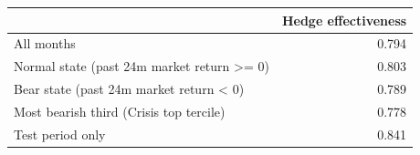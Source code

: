 \begin{tabular}{lr}
\toprule
 & Hedge effectiveness \\
\midrule
All months & 0.794 \\
Normal state (past 24m market return >= 0) & 0.803 \\
Bear state (past 24m market return < 0) & 0.789 \\
Most bearish third (Crisis top tercile) & 0.778 \\
Test period only & 0.841 \\
\bottomrule
\end{tabular}
